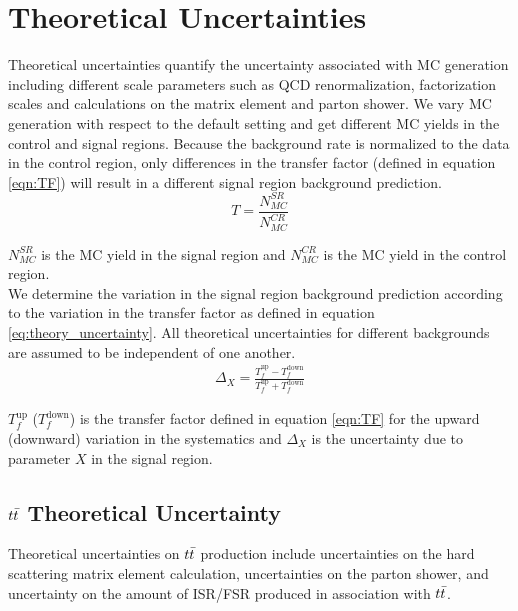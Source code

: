 
\section{Theoretical Uncertainties}
\label{sec:TheoSystematics}

\indent Theoretical uncertainties quantify the uncertainty associated with MC generation including different scale parameters such as QCD renormalization, factorization scales and calculations on the matrix element and parton shower.  We vary MC generation with respect to the default setting and get different MC yields in the control and signal regions.  Because the background rate is normalized to the data in the control region, only differences in the transfer factor (defined in equation \ref{eqn:TF}) will result in a different signal region background prediction.    \\

\begin{equation}
T = \frac{N_{MC}^{SR}}{N_{MC}^{CR}}
\label{eqn:TF}
\end{equation}

\indent $N_{MC}^{SR}$ is the MC yield in the signal region and $N_{MC}^{CR}$ is the MC yield in the control region. \\

\indent  We determine the variation in the signal region background prediction according to the variation in the transfer factor as defined in equation \ref{eq:theory_uncertainty}.   All theoretical uncertainties for different backgrounds are assumed to be independent of one another.  \\

 \begin{eqnarray}
    \Delta_{X} = \frac{T_f^{\mathrm{up}} - T_f^{\mathrm{down}}}{T_f^{\mathrm{up}} + T_f^{\mathrm{down}}}
    \label{eq:theory_uncertainty}
  \end{eqnarray}

\indent $T_f^{\mathrm{up}}$ ($T_f^{\mathrm{down}}$) is the transfer factor defined in equation \ref{eqn:TF} for the upward (downward) variation in the systematics and $\Delta_{X}$ is the uncertainty due to parameter $X$ in the signal region.  \\

\subsection{$t\bar{t}$ Theoretical Uncertainty}
\label{sec:systTheo:ttbar}

\indent Theoretical uncertainties on $t\bar{t}$ production include uncertainties on the hard scattering matrix element calculation, uncertainties on the parton shower, and uncertainty on the amount of ISR/FSR produced in association with $t\bar{t}$.  \\

